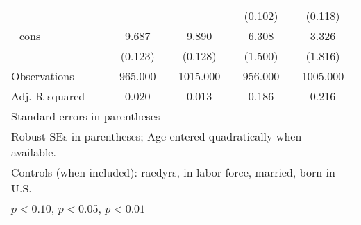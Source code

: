 \begin{table}[htbp]
\begin{tabular}{l*{4}{c}}
          &                  &                  &  (0.102)         &  (0.118)         \\
\_cons    &    9.687\sym{***}&    9.890\sym{***}&    6.308\sym{***}&    3.326\sym{*}  \\
          &  (0.123)         &  (0.128)         &  (1.500)         &  (1.816)         \\
\midrule
Observations&  965.000         & 1015.000         &  956.000         & 1005.000         \\
Adj. R-squared&    0.020         &    0.013         &    0.186         &    0.216         \\
\bottomrule
\multicolumn{5}{l}{\footnotesize Standard errors in parentheses}\\
\multicolumn{5}{l}{\footnotesize Robust SEs in parentheses; Age entered quadratically when available.}\\
\multicolumn{5}{l}{\footnotesize Controls (when included): raedyrs, in labor force, married, born in U.S.}\\
\multicolumn{5}{l}{\footnotesize \sym{*} \(p<0.10\), \sym{**} \(p<0.05\), \sym{***} \(p<0.01\)}\\
\end{tabular}
\end{table}
